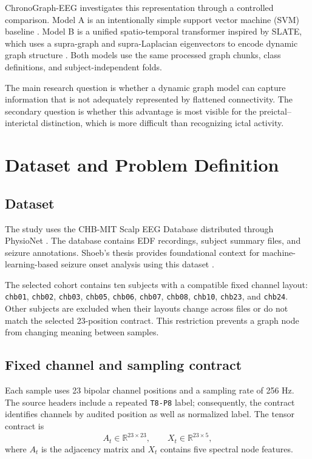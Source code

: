 \documentclass[conference]{IEEEtran}
\begin{document}
ChronoGraph-EEG investigates this representation through a controlled comparison. Model A is an intentionally simple support vector machine (SVM) baseline \cite{cortes1995svm}. Model B is a unified spatio-temporal transformer inspired by SLATE, which uses a supra-graph and supra-Laplacian eigenvectors to encode dynamic graph structure \cite{karmim2024slate}. Both models use the same processed graph chunks, class definitions, and subject-independent folds.

The main research question is whether a dynamic graph model can capture information that is not adequately represented by flattened connectivity. The secondary question is whether this advantage is most visible for the preictal--interictal distinction, which is more difficult than recognizing ictal activity.

\section{Dataset and Problem Definition}
\subsection{Dataset}
The study uses the CHB-MIT Scalp EEG Database distributed through PhysioNet \cite{guttag2010chbmit}. The database contains EDF recordings, subject summary files, and seizure annotations. Shoeb's thesis provides foundational context for machine-learning-based seizure onset analysis using this dataset \cite{shoeb2009thesis}.

The selected cohort contains ten subjects with a compatible fixed channel layout: \texttt{chb01}, \texttt{chb02}, \texttt{chb03}, \texttt{chb05}, \texttt{chb06}, \texttt{chb07}, \texttt{chb08}, \texttt{chb10}, \texttt{chb23}, and \texttt{chb24}. Other subjects are excluded when their layouts change across files or do not match the selected 23-position contract. This restriction prevents a graph node from changing meaning between samples.

\subsection{Fixed channel and sampling contract}
Each sample uses 23 bipolar channel positions and a sampling rate of 256 Hz. The source headers include a repeated \texttt{T8-P8} label; consequently, the contract identifies channels by audited position as well as normalized label. The tensor contract is
\begin{equation}
 A_t \in \mathbb{R}^{23 \times 23}, \qquad X_t \in \mathbb{R}^{23 \times 5},
\end{equation}
where $A_t$ is the adjacency matrix and $X_t$ contains five spectral node features.
\end{document}
